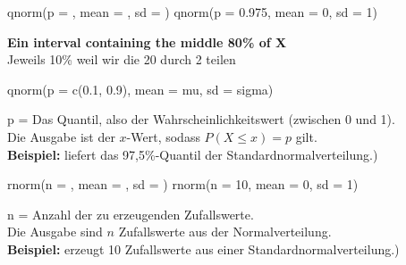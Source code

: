\begin{rcode}{1}
qnorm(p = , mean = , sd = )
qnorm(p = 0.975, mean = 0, sd = 1)
\end{rcode}
\textbf{Ein interval containing the middle 80\% of X}\\
Jeweils 10\% weil wir die 20 durch 2 teilen
\begin{rcode}{1}
qnorm(p = c(0.1, 0.9), mean = mu, sd = sigma)
\end{rcode}
p = Das Quantil, also der Wahrscheinlichkeitswert (zwischen 0 und 1).\\
Die Ausgabe ist der \(x\)-Wert, sodass \(P(X \le x) = p\) gilt.\\
\textbf{Beispiel:} liefert das 97,5\%-Quantil der Standardnormalverteilung.)
\begin{rcode}{1}
rnorm(n = , mean = , sd = )
rnorm(n = 10, mean = 0, sd = 1)
\end{rcode}
n = Anzahl der zu erzeugenden Zufallswerte.\\
Die Ausgabe sind \(n\) Zufallswerte aus der Normalverteilung.\\
\textbf{Beispiel:} erzeugt 10 Zufallswerte aus einer Standardnormalverteilung.)

\columnbreak
